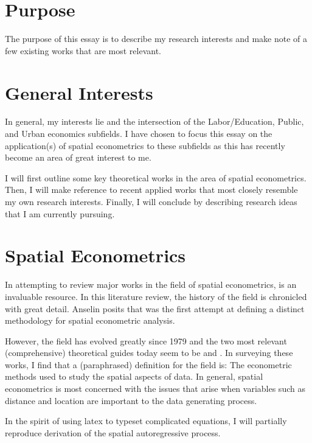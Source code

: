 \documentclass{article}
\begin{document}
\section{Purpose}

The purpose of this essay is to describe my research interests and make note of a few existing works that are most relevant.

\section{General Interests}

In general, my interests lie and the intersection of the Labor/Education, Public, and Urban economics subfields. I have chosen to focus this essay on the application(s) of spatial econometrics to these subfields as this has recently become an area of great interest to me.

I will first outline some key theoretical works in the area of spatial econometrics. Then, I will make reference to recent applied works that most closely resemble my own research interests. Finally, I will conclude by describing research ideas that I am currently pursuing.

\section{Spatial Econometrics}

In attempting to review major works in the field of spatial econometrics,  is an invaluable resource. In this literature review, the history of the field is chronicled with great detail. Anselin posits that  was the first attempt at defining a distinct methodology for spatial econometric analysis.

However, the field has evolved greatly since 1979 and the two most relevant (comprehensive) theoretical guides today seem to be  and . In surveying these works, I find that a (paraphrased) definition for the field is: The econometric methods used to study the spatial aspects of data. In general, spatial econometrics is most concerned with the issues that arise when variables such as distance and location are important to the data generating process.

In the spirit of using latex to typeset complicated equations, I will partially reproduce  derivation of the spatial autoregressive process.
\end{document}
